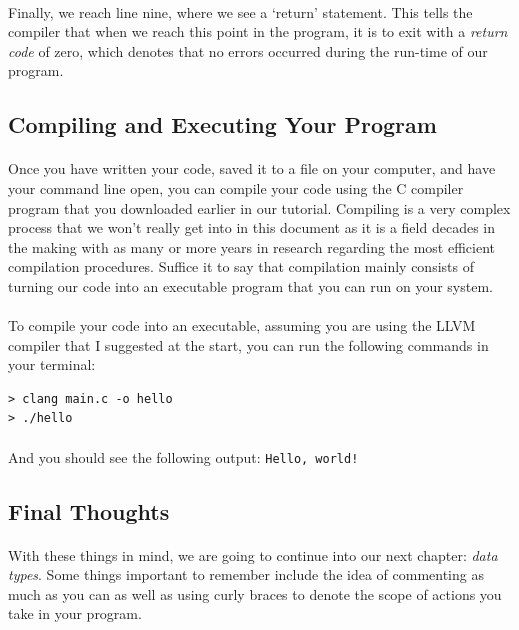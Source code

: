 \paragraph{}
   Finally, we reach line nine, where we see a `return' statement. This tells the compiler that when we reach this point in the program, it is to exit
   with a \textit{return code} of zero, which denotes that no errors occurred during the run-time of our program.

\subsection{Compiling and Executing Your Program}
   \paragraph{}
      Once you have written your code, saved it to a file on your computer, and have your command line open, you can compile your code using the C
      compiler program that you downloaded earlier in our tutorial.
      Compiling is a very complex process that we won't really get into in this document as it is a field decades in the making with as many or more
      years in research regarding the most efficient compilation procedures. Suffice it to say that compilation mainly consists of turning our code
      into an executable program that you can run on your system.

   \paragraph{}
      To compile your code into an executable, assuming you are using the LLVM compiler that I suggested at the start, you can run the following
      commands in your terminal:

\begin{lstlisting}
> clang main.c -o hello
> ./hello
\end{lstlisting}

\paragraph{}
   And you should see the following output: \verb;Hello, world!;

\subsection{Final Thoughts}
   \paragraph{}
      With these things in mind, we are going to continue into our next chapter: \textit{data types}. Some things important to remember include the idea
      of commenting as much as you can as well as using curly braces to denote the scope of actions you take in your program.

\newpage
